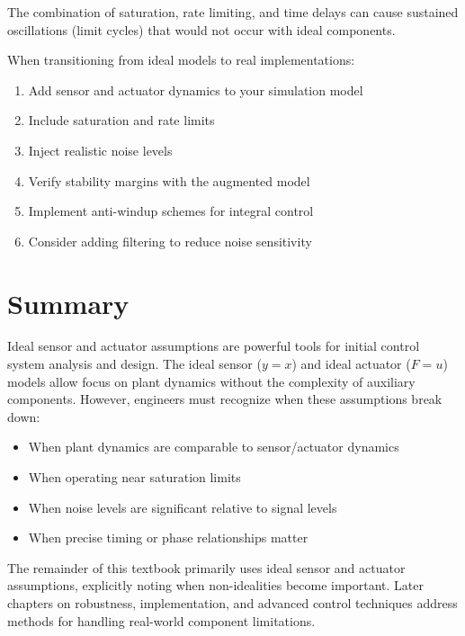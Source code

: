 The combination of saturation, rate limiting, and time delays can cause sustained oscillations (limit cycles) that would not occur with ideal components.

\begin{practicalbox}
When transitioning from ideal models to real implementations:
\begin{enumerate}
    \item Add sensor and actuator dynamics to your simulation model
    \item Include saturation and rate limits
    \item Inject realistic noise levels
    \item Verify stability margins with the augmented model
    \item Implement anti-windup schemes for integral control
    \item Consider adding filtering to reduce noise sensitivity
\end{enumerate}
\end{practicalbox}

\section{Summary}
\label{sec:ch02_summary}

Ideal sensor and actuator assumptions are powerful tools for initial control system analysis and design. The ideal sensor ($y = x$) and ideal actuator ($F = u$) models allow focus on plant dynamics without the complexity of auxiliary components. However, engineers must recognize when these assumptions break down:

\begin{itemize}
    \item When plant dynamics are comparable to sensor/actuator dynamics
    \item When operating near saturation limits
    \item When noise levels are significant relative to signal levels
    \item When precise timing or phase relationships matter
\end{itemize}

The remainder of this textbook primarily uses ideal sensor and actuator assumptions, explicitly noting when non-idealities become important. Later chapters on robustness, implementation, and advanced control techniques address methods for handling real-world component limitations.



